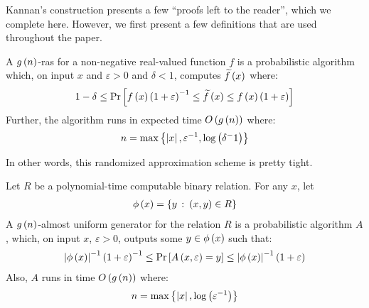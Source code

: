 Kannan's construction presents a few ``proofs left to the reader'',
which we complete here.
However, we first present a few definitions that are used throughout
the paper.

\begin{definition}
  A \(g\left(n\right)\)-ras for a non-negative real-valued function
  \(f\) is a probabilistic algorithm which,
  on input \(x\) and \(\varepsilon > 0\) and \(\delta < 1\),
  computes \(\widetilde{f}\left(x\right)\) where:
  \begin{align*}
    1 - \delta \leq
    \mathrm{Pr}\left[
      f\left(x\right) \left(1 + \varepsilon\right)^{-1}
        \leq \widetilde{f}\left(x\right)
        \leq f\left(x\right) \left(1 + \varepsilon\right)\right]
  \end{align*}
  Further, the algorithm runs in expected time \(O\left(g\left(n\right)\right)\)
  where:
  \begin{align*}
    n = \max\left\{\left\lvert x\right\rvert, \varepsilon^{-1}, \log\left(\delta^-1\right)\right\}
  \end{align*}
\end{definition}

In other words, this randomized approximation scheme is pretty tight.

\begin{definition}
  Let \(R\) be a polynomial-time computable binary relation.
  For any \(x\), let
  \begin{align*}
    \phi\left(x\right) = \left\{y \ \colon \left(x, y\right) \in R\right\}
  \end{align*}
  A \(g\left(n\right)\)-almost uniform generator for the relation
  \(R\) is a probabilistic algorithm \(A\),
  which, on input \(x\), \(\varepsilon > 0\),
  outputs some \(y \in \phi\left(x\right)\) such that:
  \begin{align*}
    \left\lvert\phi\left(x\right)\right\rvert^{-1} \left(1 + \varepsilon\right)^{-1}
      \leq \mathrm{Pr}\left[A\left(x, \varepsilon\right) = y\right]
      \leq \left\lvert\phi\left(x\right)\right\rvert^{-1} \left(1 + \varepsilon\right)
  \end{align*}
  Also, \(A\) runs in time \(O\left(g\left(n\right)\right)\)
  where:
  \begin{align*}
    n = \max\left\{\left\lvert x\right\rvert, \log\left(\varepsilon^{-1}\right)\right\}
  \end{align*}
\end{definition}

